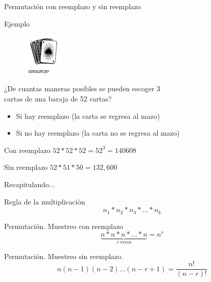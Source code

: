 \documentclass{beamer}
\begin{document}
\begin{frame}{Permutaci\'on con reemplazo y sin reemplazo}
  \begin{exampleblock}{Ejemplo}
    \begin{figure}
      \raggedleft
      \includegraphics[width=2cm,angle=0,trim={1mm 250mm 1mm 310mm},clip]{figures/deck-of-cards.png}
    \end{figure}

    ¿De cuantas maneras posibles se pueden escoger 3 
    \\cartas de una baraja de 52
    cartas?
    \begin{itemize}
      \item Si hay reemplazo (la carta se regresa al mazo)
      \item Si no hay reemplazo (la carta no se regresa al mazo)
    \end{itemize}
  \end{exampleblock}

  \begin{exampleblock}{Con reemplazo}
    \centering
    $52*52*52 = 52^{3} = 140 608$
  \end{exampleblock}

  \begin{exampleblock}{Sin reemplazo}
    \centering
    $52*51*50 = 132,600$
  \end{exampleblock}

\end{frame}

\begin{frame}{Recapitulando...}
  \begin{block}{Regla de la multiplicaci\'on}
    \begin{equation}
      n_1*n_2*n_3*...*n_k
    \end{equation}
  \end{block}

  \begin{block}{Permutaci\'on. Muestreo con reemplazo}
    \begin{equation}
      \underbrace{n*n*n*...*n}_{r \ \text{veces}} = n^r
    \end{equation}
  \end{block}

  \begin{block}{Permutaci\'on. Muestreo sin reemplazo.}
    \begin{equation}
      n(n-1)(n-2)...(n-r+1) = \frac {n!}{(n-r)!}
    \end{equation}
  \end{block}

\end{frame}
\end{document}
